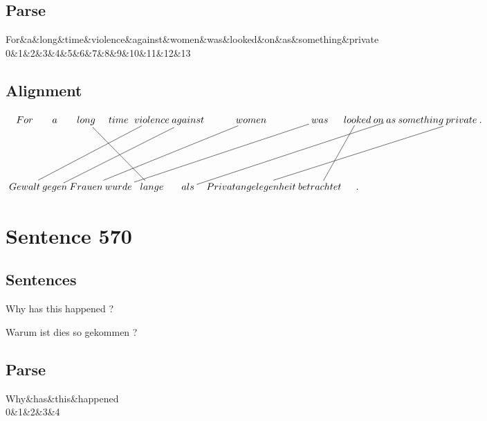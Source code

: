 \documentclass{report}
\begin{document}
\subsection*{Parse}
\begin{dependency}[theme=simple]
\begin{deptext}[column sep=.5cm, row sep=.1ex]
For\&a\&long\&time\&violence\&against\&women\&was\&looked\&on\&as\&something\&private\\
0\&1\&2\&3\&4\&5\&6\&7\&8\&9\&10\&11\&12\&13\\
\end{deptext}
\end{dependency}


\subsection*{Alignment}
\scriptsize{
$
\xymatrix@C-2.3pc{
For & a & long \ar @{-} [ddrr] & time & violence \ar @{-} [ddllll] & against \ar @{-} [ddllll] & women \ar @{-} [ddllll] & was \ar @{-} [ddllll] & looked \ar @{-} [ddl] & on & as \ar @{-} [ddlllll] & something & private \ar @{-} [ddllllll] & .\\\\
Gewalt & gegen & Frauen & wurde & lange & als & Privatangelegenheit & betrachtet & .
}$}
\newpage\section*{Sentence 570}

\subsection*{Sentences}
Why has this happened ?

\noindent Warum ist dies so gekommen ?



\subsection*{Parse}
\begin{dependency}[theme=simple]
\begin{deptext}[column sep=.5cm, row sep=.1ex]
Why\&has\&this\&happened\\
0\&1\&2\&3\&4\\
\end{deptext}
\end{dependency}
\end{document}
